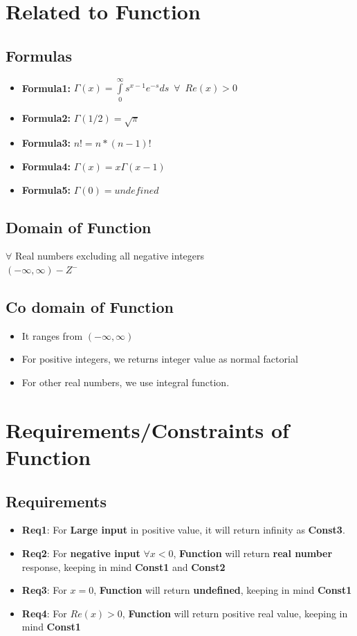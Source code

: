 \documentclass{article}
\begin{document}
\section{Related to Function}
\subsection{Formulas}
\begin{itemize}
\item \textbf{Formula1: } $  \Gamma \left( x \right) = \int\limits_0^\infty {s^{x - 1} e^{ - s} ds} \enspace \forall \enspace Re(x)>0$
\item \textbf{Formula2: } $  \Gamma \left( 1/2 \right) = \sqrt{\pi}$
\item \textbf{Formula3: } $  n! = n*(n-1)!$
\item \textbf{Formula4: } $  \Gamma \left( x \right) = x\Gamma \left( x-1\right) $
\item \textbf{Formula5: } $  \Gamma \left( 0 \right) = undefined $
\end{itemize}

\subsection{Domain of Function}
$\forall$ Real numbers excluding all negative integers \\
$(-\infty, \infty) - Z^{-}$

\subsection{Co domain of Function}
\begin{itemize}
\item It ranges from $(-\infty, \infty)$
\item For positive integers, we returns integer value as normal factorial
\item For other real numbers, we use integral function.
\end{itemize}

\section{Requirements/Constraints of Function}
\subsection{Requirements}
\begin{itemize}
\item \textbf{Req1}: For \textbf{Large input} in positive value, it will return infinity as \textbf{Const3}.
\item \textbf{Req2}: For \textbf{negative input} $\forall x<0 $, \textbf{Function} will return \textbf{real number} response, keeping in mind \textbf{Const1} and \textbf{Const2}
\item \textbf{Req3}: For \textbf{$x=0$}, \textbf{Function} will return \textbf{undefined}, keeping in mind \textbf{Const1}
\item \textbf{Req4}: For \textbf{$Re(x) > 0$}, \textbf{Function} will return positive real value, keeping in mind \textbf{Const1}
\end{itemize}
\end{document}
